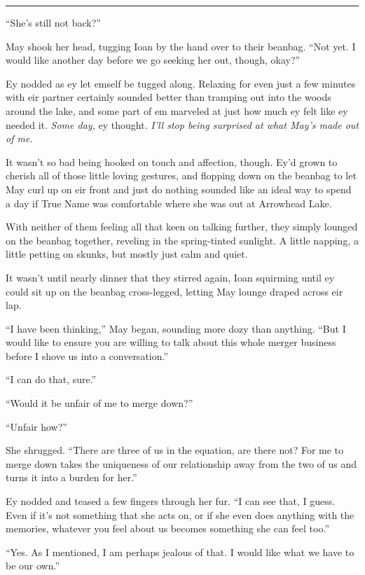 \begin{center}\rule{0.5\linewidth}{0.5pt}\end{center}

``She's still not back?''

May shook her head, tugging Ioan by the hand over to their beanbag. ``Not yet. I would like another day before we go seeking her out, though, okay?''

Ey nodded as ey let emself be tugged along. Relaxing for even just a few minutes with eir partner certainly sounded better than tramping out into the woods around the lake, and some part of em marveled at just how much ey felt like ey needed it. \emph{Some day,} ey thought. \emph{I'll stop being surprised at what May's made out of me.}

It wasn't so bad being hooked on touch and affection, though. Ey'd grown to cherish all of those little loving gestures, and flopping down on the beanbag to let May curl up on eir front and just do nothing sounded like an ideal way to spend a day if True Name was comfortable where she was out at Arrowhead Lake.

With neither of them feeling all that keen on talking further, they simply lounged on the beanbag together, reveling in the spring-tinted sunlight. A little napping, a little petting on skunks, but mostly just calm and quiet.

It wasn't until nearly dinner that they stirred again, Ioan squirming until ey could sit up on the beanbag cross-legged, letting May lounge draped across eir lap.

``I have been thinking,'' May began, sounding more dozy than anything. ``But I would like to ensure you are willing to talk about this whole merger business before I shove us into a conversation.''

``I can do that, sure.''

``Would it be unfair of me to merge down?''

``Unfair how?''

She shrugged. ``There are three of us in the equation, are there not? For me to merge down takes the uniqueness of our relationship away from the two of us and turns it into a burden for her.''

Ey nodded and teased a few fingers through her fur. ``I can see that, I guess. Even if it's not something that she acts on, or if she even does anything with the memories, whatever you feel about us becomes something she can feel too.''

``Yes. As I mentioned, I am perhaps jealous of that. I would like what we have to be our own.''

